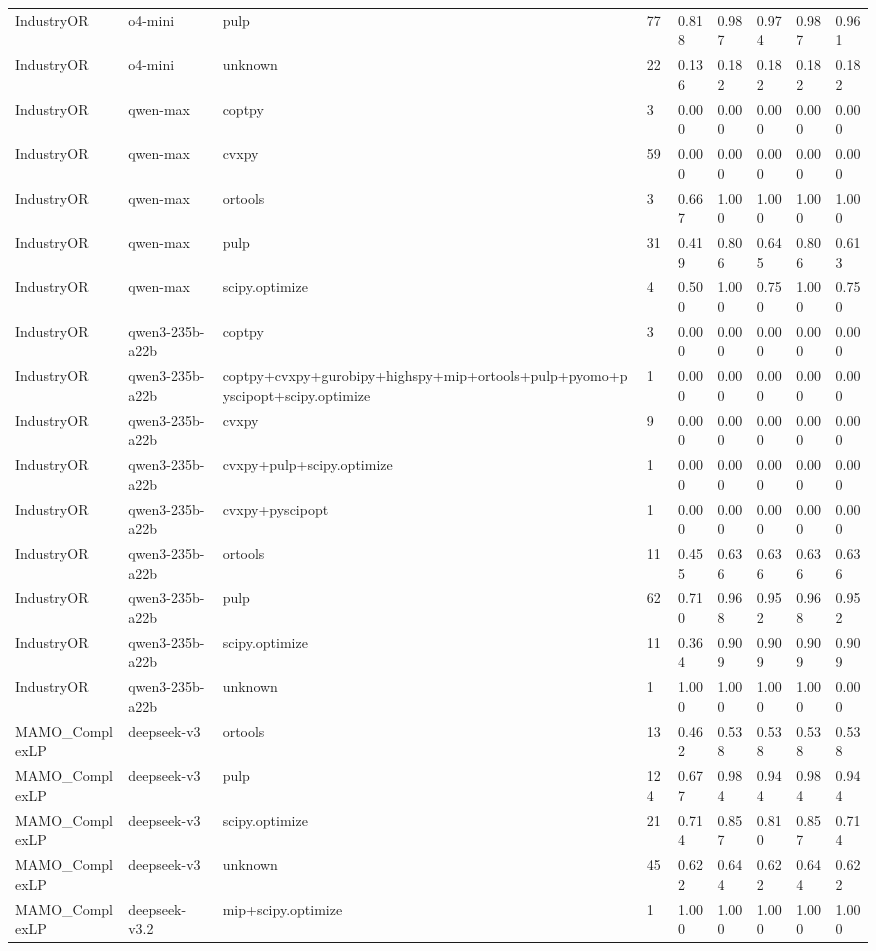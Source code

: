 \begin{table}[t]
\begin{tabular}{lllllllll}
IndustryOR & o4-mini & pulp & 77 & 0.818 & 0.987 & 0.974 & 0.987 & 0.961 \\
IndustryOR & o4-mini & unknown & 22 & 0.136 & 0.182 & 0.182 & 0.182 & 0.182 \\
IndustryOR & qwen-max & coptpy & 3 & 0.000 & 0.000 & 0.000 & 0.000 & 0.000 \\
IndustryOR & qwen-max & cvxpy & 59 & 0.000 & 0.000 & 0.000 & 0.000 & 0.000 \\
IndustryOR & qwen-max & ortools & 3 & 0.667 & 1.000 & 1.000 & 1.000 & 1.000 \\
IndustryOR & qwen-max & pulp & 31 & 0.419 & 0.806 & 0.645 & 0.806 & 0.613 \\
IndustryOR & qwen-max & scipy.optimize & 4 & 0.500 & 1.000 & 0.750 & 1.000 & 0.750 \\
IndustryOR & qwen3-235b-a22b & coptpy & 3 & 0.000 & 0.000 & 0.000 & 0.000 & 0.000 \\
IndustryOR & qwen3-235b-a22b & coptpy+cvxpy+gurobipy+highspy+mip+ortools+pulp+pyomo+pyscipopt+scipy.optimize & 1 & 0.000 & 0.000 & 0.000 & 0.000 & 0.000 \\
IndustryOR & qwen3-235b-a22b & cvxpy & 9 & 0.000 & 0.000 & 0.000 & 0.000 & 0.000 \\
IndustryOR & qwen3-235b-a22b & cvxpy+pulp+scipy.optimize & 1 & 0.000 & 0.000 & 0.000 & 0.000 & 0.000 \\
IndustryOR & qwen3-235b-a22b & cvxpy+pyscipopt & 1 & 0.000 & 0.000 & 0.000 & 0.000 & 0.000 \\
IndustryOR & qwen3-235b-a22b & ortools & 11 & 0.455 & 0.636 & 0.636 & 0.636 & 0.636 \\
IndustryOR & qwen3-235b-a22b & pulp & 62 & 0.710 & 0.968 & 0.952 & 0.968 & 0.952 \\
IndustryOR & qwen3-235b-a22b & scipy.optimize & 11 & 0.364 & 0.909 & 0.909 & 0.909 & 0.909 \\
IndustryOR & qwen3-235b-a22b & unknown & 1 & 1.000 & 1.000 & 1.000 & 1.000 & 0.000 \\
MAMO\_ComplexLP & deepseek-v3 & ortools & 13 & 0.462 & 0.538 & 0.538 & 0.538 & 0.538 \\
MAMO\_ComplexLP & deepseek-v3 & pulp & 124 & 0.677 & 0.984 & 0.944 & 0.984 & 0.944 \\
MAMO\_ComplexLP & deepseek-v3 & scipy.optimize & 21 & 0.714 & 0.857 & 0.810 & 0.857 & 0.714 \\
MAMO\_ComplexLP & deepseek-v3 & unknown & 45 & 0.622 & 0.644 & 0.622 & 0.644 & 0.622 \\
MAMO\_ComplexLP & deepseek-v3.2 & mip+scipy.optimize & 1 & 1.000 & 1.000 & 1.000 & 1.000 & 1.000 \\

\end{tabular}
\end{table}
